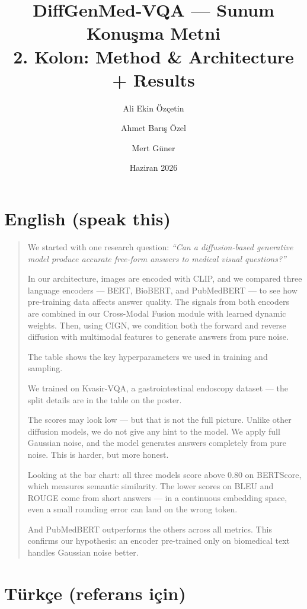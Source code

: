 \documentclass[12pt, a4paper]{article}
\title{\textbf{DiffGenMed-VQA — Sunum Konuşma Metni}\\
\large 2. Kolon: Method \& Architecture + Results}
\author{Ali Ekin Özçetin \and Ahmet Barış Özel \and Mert Güner}
\date{Haziran 2026}
\begin{document}
\maketitle

\section*{English (speak this)}

\begin{quote}
\large

We started with one research question:
\textit{``Can a diffusion-based generative model produce accurate free-form answers to medical visual questions?''}

In our architecture, images are encoded with CLIP, and we compared three language encoders — BERT, BioBERT, and PubMedBERT — to see how pre-training data affects answer quality.
The signals from both encoders are combined in our Cross-Modal Fusion module with learned dynamic weights.
Then, using CIGN, we condition both the forward and reverse diffusion with multimodal features to generate answers from pure noise.

The table shows the key hyperparameters we used in training and sampling.

We trained on Kvasir-VQA, a gastrointestinal endoscopy dataset — the split details are in the table on the poster.

The scores may look low — but that is not the full picture.
Unlike other diffusion models, we do not give any hint to the model.
We apply full Gaussian noise, and the model generates answers completely from pure noise.
This is harder, but more honest.

Looking at the bar chart: all three models score above 0.80 on BERTScore, which measures semantic similarity.
The lower scores on BLEU and ROUGE come from short answers — in a continuous embedding space, even a small rounding error can land on the wrong token.

And PubMedBERT outperforms the others across all metrics.
This confirms our hypothesis: an encoder pre-trained only on biomedical text handles Gaussian noise better.

\end{quote}

\section*{Türkçe (referans için)}
\end{document}
